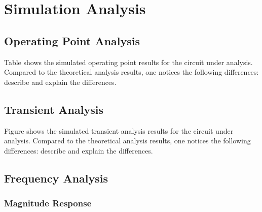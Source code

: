 \section{Simulation Analysis}
\label{sec:simulation}

\subsection{Operating Point Analysis}

Table
shows the simulated operating point results for the circuit
under analysis. Compared to the theoretical analysis results, one notices the
following differences: describe and explain the differences.

%    



\subsection{Transient Analysis}

Figure
shows the simulated transient analysis results for the
circuit under analysis. Compared to the theoretical analysis results, one
notices the following differences: describe and explain the differences.





\subsection{Frequency Analysis}

\subsubsection{Magnitude Response}

